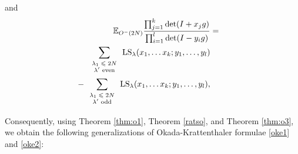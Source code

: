 \documentclass[11pt]{amsart}
\newcommand{\tmop}[1]{\ensuremath{\operatorname{#1}}}
\newcommand{\tmscript}[1]{\text{\scriptsize $#1$}}
\begin{document}
and
\begin{eqnarray*}
  \mathbb{E}_{O^- ( 2 N )} \frac{\prod_{j = 1}^k \det ( I + x_j g )}{\prod_{i
  = 1}^l \det ( I - y_i g )} & = & \\
  \sum_{\tmscript{\begin{array}{c}
    \lambda_1 \leqslant 2 N\\
    \text{$\lambda'$ even}
  \end{array}}} \tmop{LS}_{\lambda} ( x_1, \ldots x_k ; y_1, \ldots, y_l ) &
  & \\
  - \sum_{\tmscript{\begin{array}{c}
    \lambda_1 \leqslant 2 N\\
    \text{$\lambda'$ odd}
  \end{array}}} \tmop{LS}_{\lambda} ( x_1, \ldots x_k ; y_1, \ldots, y_l ), &
  &
\end{eqnarray*}


Consequently, using Theorem \ref{thm:o1}, Theorem \ref{ratso}, and
Theorem \ref{thm:o3}, we obtain the following generalizations of
Okada-Krattenthaler formulae \eqref{oke1} and \eqref{oke2}:
\end{document}
